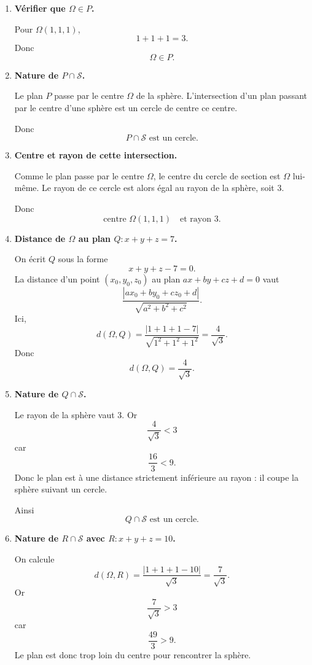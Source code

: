 \documentclass[11pt,a4paper]{article}
\newcommand{\Sphere}{\mathcal{S}}
\begin{document}
\begin{enumerate}[label=\textbf{\arabic*.},resume]
    \item \textbf{Vérifier que \(\Omega\in P\).}

    Pour \(\Omega(1,1,1)\),
    \[
    1+1+1=3.
    \]
    Donc
    \[
    \boxed{\Omega\in P.}
    \]

    \item \textbf{Nature de \(P\cap \Sphere\).}

    Le plan \(P\) passe par le centre \(\Omega\) de la sphère. L'intersection d'un plan passant par le centre d'une sphère est un cercle de centre ce centre.

    Donc
    \[
    \boxed{P\cap \Sphere \text{ est un cercle.}}
    \]

    \item \textbf{Centre et rayon de cette intersection.}

    Comme le plan passe par le centre \(\Omega\), le centre du cercle de section est \(\Omega\) lui-même.  
    Le rayon de ce cercle est alors égal au rayon de la sphère, soit \(3\).

    Donc
    \[
    \boxed{\text{centre } \Omega(1,1,1)\quad\text{et rayon }3.}
    \]

    \item \textbf{Distance de \(\Omega\) au plan \(Q:x+y+z=7\).}

    On écrit \(Q\) sous la forme
    \[
    x+y+z-7=0.
    \]
    La distance d'un point \((x_0,y_0,z_0)\) au plan \(ax+by+cz+d=0\) vaut
    \[
    \frac{|ax_0+by_0+cz_0+d|}{\sqrt{a^2+b^2+c^2}}.
    \]
    Ici,
    \[
    d(\Omega,Q)=\frac{|1+1+1-7|}{\sqrt{1^2+1^2+1^2}}
    =\frac{4}{\sqrt3}.
    \]
    Donc
    \[
    \boxed{d(\Omega,Q)=\frac{4}{\sqrt3}.}
    \]

    \item \textbf{Nature de \(Q\cap \Sphere\).}

    Le rayon de la sphère vaut \(3\). Or
    \[
    \frac{4}{\sqrt3}<3
    \]
    car
    \[
    \frac{16}{3}<9.
    \]
    Donc le plan est à une distance strictement inférieure au rayon : il coupe la sphère suivant un cercle.

    Ainsi
    \[
    \boxed{Q\cap \Sphere \text{ est un cercle.}}
    \]

    \item \textbf{Nature de \(R\cap \Sphere\) avec \(R:x+y+z=10\).}

    On calcule
    \[
    d(\Omega,R)=\frac{|1+1+1-10|}{\sqrt3}=\frac{7}{\sqrt3}.
    \]
    Or
    \[
    \frac{7}{\sqrt3}>3
    \]
    car
    \[
    \frac{49}{3}>9.
    \]
    Le plan est donc trop loin du centre pour rencontrer la sphère.


\end{enumerate}
\end{document}
